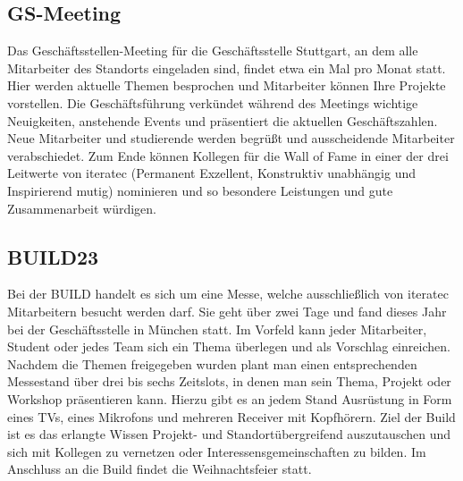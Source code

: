 \subsection{GS-Meeting}
Das Geschäftsstellen-Meeting für die Geschäftsstelle Stuttgart, an dem alle Mitarbeiter des Standorts eingeladen sind,
findet etwa ein Mal pro Monat statt. Hier werden aktuelle Themen besprochen und Mitarbeiter können Ihre Projekte
vorstellen. Die Geschäftsführung verkündet während des Meetings wichtige Neuigkeiten, anstehende Events und präsentiert
die aktuellen Geschäftszahlen. Neue Mitarbeiter und studierende werden begrüßt und ausscheidende Mitarbeiter
verabschiedet. Zum Ende können Kollegen für die Wall of Fame in einer der drei Leitwerte von iteratec (Permanent
Exzellent, Konstruktiv unabhängig und Inspirierend mutig) nominieren und so besondere Leistungen und gute Zusammenarbeit
würdigen.

\subsection{BUILD23}
Bei der BUILD handelt es sich um eine Messe, welche ausschließlich von iteratec Mitarbeitern besucht werden darf. Sie
geht über zwei Tage und fand dieses Jahr bei der Geschäftsstelle in München statt. Im Vorfeld kann jeder Mitarbeiter,
Student oder jedes Team sich ein Thema überlegen und als Vorschlag einreichen. Nachdem die Themen freigegeben wurden
plant man einen entsprechenden Messestand über drei bis sechs Zeitslots, in denen man sein Thema, Projekt oder Workshop
präsentieren kann. Hierzu gibt es an jedem Stand Ausrüstung in Form eines TVs, eines Mikrofons und mehreren Receiver mit
Kopfhörern. Ziel der Build ist es das erlangte Wissen Projekt- und Standortübergreifend auszutauschen und sich mit
Kollegen zu vernetzen oder Interessensgemeinschaften zu bilden. Im Anschluss an die Build findet die Weihnachtsfeier
statt.

%

